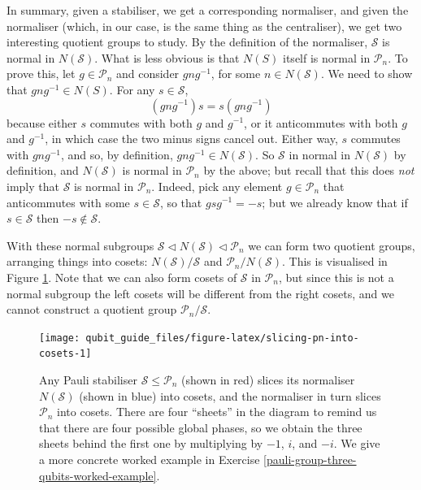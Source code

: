 \documentclass[fleqn,a4paper]{article}
\theoremstyle{definition}
\theoremstyle{definition}
\theoremstyle{definition}
\theoremstyle{definition}
\theoremstyle{remark}
\begin{document}
In summary, given a stabiliser, we get a corresponding normaliser, and given the normaliser (which, in our case, is the same thing as the centraliser), we get two interesting quotient groups to study.
By the definition of the normaliser, \(\mathcal{S}\) is normal in \(N(\mathcal{S})\).
What is less obvious is that \(N(S)\) itself is normal in \(\mathcal{P}_n\).
To prove this, let \(g\in\mathcal{P}_n\) and consider \(gng^{-1}\), for some \(n\in N(\mathcal{S})\).
We need to show that \(gng^{-1}\in N(S)\).
For any \(s\in\mathcal{S}\),
\[
  (gng^{-1})s = s(gng^{-1})
\]
because either \(s\) commutes with both \(g\) and \(g^{-1}\), or it anticommutes with both \(g\) and \(g^{-1}\), in which case the two minus signs cancel out.
Either way, \(s\) commutes with \(gng^{-1}\), and so, by definition, \(gng^{-1}\in N(\mathcal{S})\).
So \(\mathcal{S}\) in normal in \(N(\mathcal{S})\) by definition, and \(N(\mathcal{S})\) is normal in \(\mathcal{P}_n\) by the above; but recall that this does \emph{not} imply that \(\mathcal{S}\) is normal in \(\mathcal{P}_n\).
Indeed, pick any element \(g\in\mathcal{P}_n\) that anticommutes with some \(s\in\mathcal{S}\), so that \(gsg^{-1}=-s\); but we already know that if \(s\in\mathcal{S}\) then \(-s\not\in\mathcal{S}\).

With these normal subgroups \(\mathcal{S}\triangleleft N(\mathcal{S})\triangleleft\mathcal{P}_n\) we can form two quotient groups, arranging things into cosets: \(N(\mathcal{S})/\mathcal{S}\) and \(\mathcal{P}_n/N(\mathcal{S})\).
This is visualised in Figure \ref{fig:slicing-pn-into-cosets}.
Note that we can also form cosets of \(\mathcal{S}\) in \(\mathcal{P}_n\), but since this is not a normal subgroup the left cosets will be different from the right cosets, and we cannot construct a quotient group \(\mathcal{P}_n/\mathcal{S}\).



\begin{figure}[H]

{\centering \texttt{[image: qubit\_guide\_files/figure-latex/slicing-pn-into-cosets-1]} 

}

\caption{Any Pauli stabiliser \(\mathcal{S}\leqslant\mathcal{P}_n\) (shown in red) slices its normaliser \(N(\mathcal{S})\) (shown in blue) into cosets, and the normaliser in turn slices \(\mathcal{P}_n\) into cosets. There are four ``sheets'' in the diagram to remind us that there are four possible global phases, so we obtain the three sheets behind the first one by multiplying by \(-1\), \(i\), and \(-i\). We give a more concrete worked example in Exercise \ref{pauli-group-three-qubits-worked-example}.}\label{fig:slicing-pn-into-cosets}
\end{figure}
\end{document}
